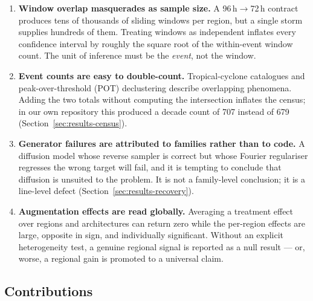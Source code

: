 \begin{enumerate}
    \item \textbf{Window overlap masquerades as sample size.} A 96\,h$\rightarrow$72\,h
    contract produces tens of thousands of sliding windows per region, but a
    single storm supplies hundreds of them. Treating windows as independent
    inflates every confidence interval by roughly the square root of the
    within-event window count. The unit of inference must be the \emph{event},
    not the window.
    \item \textbf{Event counts are easy to double-count.} Tropical-cyclone
    catalogues and peak-over-threshold (POT) declustering describe overlapping
    phenomena. Adding the two totals without computing the intersection inflates
    the census; in our own repository this produced a decade count of 707
    instead of 679 (Section~\ref{sec:results-census}).
    \item \textbf{Generator failures are attributed to families rather than to
    code.} A diffusion model whose reverse sampler is correct but whose Fourier
    regulariser regresses the wrong target will fail, and it is tempting to
    conclude that diffusion is unsuited to the problem. It is not a
    family-level conclusion; it is a line-level defect
    (Section~\ref{sec:results-recovery}).
    \item \textbf{Augmentation effects are read globally.} Averaging a
    treatment effect over regions and architectures can return zero while the
    per-region effects are large, opposite in sign, and individually
    significant. Without an explicit heterogeneity test, a genuine regional
    signal is reported as a null result --- or, worse, a regional gain is
    promoted to a universal claim.
\end{enumerate}

\subsection{Contributions}

